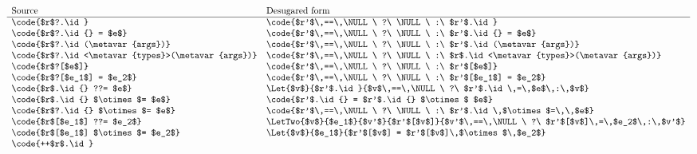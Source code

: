 \documentclass[makeidx]{article}
\begin{document}
{\begin{figure}[t]
  \begin{minipage}[h]{\textwidth}
    \begin{displaymath}
      \begin{array}{ll}
        \mbox{Source} & \mbox{Desugared form} \\
        \hline
        \code{$r$?.\id} &
        \code{$r'$\,==\,\NULL\ ?\ \NULL\ :\ $r'$.\id}
        \\
        \code{$r$?.\id{} = $e$} &
        \code{$r'$\,==\,\NULL\ ?\ \NULL\ :\ $r'$.\id{} = $e$}
        \\
        \code{$r$?.\id(\metavar{args})} &
        \code{$r'$\,==\,\NULL\ ?\ \NULL\ :\ $r'$.\id(\metavar{args})}
        \\
        \code{$r$?.\id<\metavar{types}>(\metavar{args})} &
        \code{$r'$\,==\,\NULL\ ?\ \NULL\ :\ $r$.\id<\metavar{types}>(\metavar{args})}
        \\
        \code{$r$?[$e$]} &
        \code{$r'$\,==\,\NULL\ ?\ \NULL\ :\ $r'$[$e$]}
        \\
        \code{$r$?[$e_1$] = $e_2$} &
        \code{$r'$\,==\,\NULL\ ?\ \NULL\ :\ $r'$[$e_1$] = $e_2$}
        \\
        \code{$r$.\id{} ??= $e$} &
        \Let{$v$}{$r'$.\id}{$v$\,==\,\NULL\ ?\ $r'$.\id\,=\,$e$\,:\,$v$}
        \\
        \code{$r$.\id{} $\otimes$= $e$} &
        \code{$r'$.\id{} = $r'$.\id{} $\otimes$ $e$}
        \\
        \code{$r$?.\id{} $\otimes$= $e$} &
        \code{$r'$\,==\,\NULL\ ?\ \NULL\ :\ $r'$.\id\,$\otimes$=\,\,$e$}
        \\
        \code{$r$[$e_1$] ??= $e_2$} &
        \LetTwo{$v$}{$e_1$}{$v'$}{$r'$[$v$]}{%
          $v'$\,==\,\NULL\ ?\ $r'$[$v$]\,=\,$e_2$\,:\,$v'$}
        \\
        \code{$r$[$e_1$] $\otimes$= $e_2$} &
        \Let{$v$}{$e_1$}{$r'$[$v$] = $r'$[$v$]\,$\otimes$\,$e_2$}
        \\
        \code{++$r$.\id} &

\end{array}
\end{displaymath}
\end{minipage}
\end{figure}}
\end{document}
